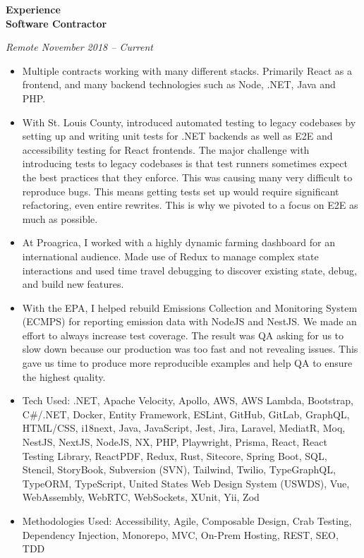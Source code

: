 \documentclass[a4ppaper, 10pt]{article}
\newcommand{\heading}[1]{\vspace{6pt}\noindent\textbf{\large #1}\vspace{4pt}\\}
\newcommand{\subheading}[1]{\vspace{2pt}\noindent\textbf{#1}\par}
\begin{document}
	\heading{Experience}
	\subheading{Software Contractor}
	\raggedright
	\textit{Remote \hfill November 2018 -- Current} \\
	\begin{itemize}[itemsep=0pt, topsep=2pt]
		\item Multiple contracts working with many different stacks. Primarily React as a frontend, and many backend technologies such as Node, .NET, Java and PHP.
		\item With St. Louis County, introduced automated testing to legacy codebases by setting up and writing unit tests for .NET backends as well as E2E and accessibility testing for React frontends. The major challenge with introducing tests to legacy codebases is that test runners sometimes expect the best practices that they enforce. This was causing many very difficult to reproduce bugs. This means getting tests set up would require significant refactoring, even entire rewrites. This is why we pivoted to a focus on E2E as much as possible.
		\item At Proagrica, I worked with a highly dynamic farming dashboard for an international audience. Made use of Redux to manage complex state interactions and used time travel debugging to discover existing state, debug, and build new features.
		\item With the EPA, I helped rebuild Emissions Collection and Monitoring System (ECMPS) for reporting emission data with NodeJS and NestJS. We made an effort to always increase test coverage. The result was QA asking for us to slow down because our production was too fast and not revealing issues. This gave us time to produce more reproducible examples and help QA to ensure the highest quality.
		\item Tech Used: .NET, Apache Velocity, Apollo, AWS, AWS Lambda, Bootstrap, C\#/.NET, Docker, Entity Framework, ESLint, GitHub, GitLab, GraphQL, HTML/CSS, i18next, Java, JavaScript, Jest, Jira, Laravel, MediatR, Moq, NestJS, NextJS, NodeJS, NX, PHP, Playwright, Prisma, React, React Testing Library, ReactPDF, Redux, Rust, Sitecore, Spring Boot, SQL, Stencil, StoryBook, Subversion (SVN), Tailwind, Twilio, TypeGraphQL, TypeORM, TypeScript, United States Web Design System (USWDS), Vue, WebAssembly, WebRTC, WebSockets, XUnit, Yii, Zod
		\item Methodologies Used: Accessibility, Agile, Composable Design, Crab Testing, Dependency Injection, Monorepo, MVC, On-Prem Hosting, REST, SEO, TDD
	\end{itemize}
\end{document}
